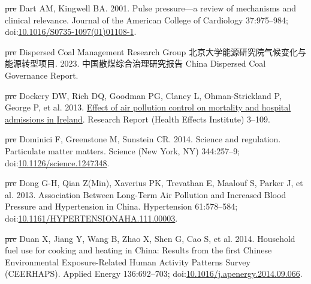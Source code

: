 \documentclass[
  letterpaper,
  DIV=11,
  numbers=noendperiod]{scrartcl}
\newlength{\cslhangindent}
\newenvironment{CSLReferences}[2] %
 {\begin{list}{}{%
  \setlength{\itemindent}{0pt} %
  \setlength{\leftmargin}{0pt} %
  \setlength{\parsep}{0pt} %
  \ifodd #1
   \setlength{\leftmargin}{\cslhangindent} %
   \setlength{\itemindent}{-1\cslhangindent} %
  \fi
  \setlength{\itemsep}{#2\baselineskip}}} %
 {\end{list}} %
\providecommand{\DIFdel}[1]{{\protect\color{red}\sout{#1}}}                      %
\providecommand{\DIFaddbegin}{} %
\providecommand{\DIFaddend}{} %
\providecommand{\DIFdelbegin}{} %
\providecommand{\DIFdelend}{} %
\newcommand{\DIFscaledelfig}{0.5}
\newlength{\DIFdelgraphicswidth} %
\newlength{\DIFdelgraphicsheight} %
\newcommand{\DIFaddincludegraphics}[2][]{{\color{blue}\fbox{\DIFOincludegraphics[#1]{#2}}}} %
\newcommand{\DIFdelincludegraphics}[2][]{%
\sbox{\DIFdelgraphicsbox}{\DIFOincludegraphics[#1]{#2}}%
\settoboxwidth{\DIFdelgraphicswidth}{\DIFdelgraphicsbox} %
\settoboxtotalheight{\DIFdelgraphicsheight}{\DIFdelgraphicsbox} %
\scalebox{\DIFscaledelfig}{%
\parbox[b]{\DIFdelgraphicswidth}{\usebox{\DIFdelgraphicsbox}\\[-\baselineskip] \rule{\DIFdelgraphicswidth}{0em}}\llap{\resizebox{\DIFdelgraphicswidth}{\DIFdelgraphicsheight}{%
\setlength{\unitlength}{\DIFdelgraphicswidth}%
\begin{picture}(1,1)%
\thicklines\linethickness{2pt} %
{\color[rgb]{1,0,0}\put(0,0){\framebox(1,1){}}}%
{\color[rgb]{1,0,0}\put(0,0){\line( 1,1){1}}}%
{\color[rgb]{1,0,0}\put(0,1){\line(1,-1){1}}}%
\end{picture}%
}\hspace*{3pt}}} %
} %
\DeclareRobustCommand{\DIFaddbegin}{\DIFOaddbegin \let\includegraphics\DIFaddincludegraphics} %
\DeclareRobustCommand{\DIFaddend}{\DIFOaddend \let\includegraphics\DIFOincludegraphics} %
\DeclareRobustCommand{\DIFdelbegin}{\DIFOdelbegin \let\includegraphics\DIFdelincludegraphics} %
\DeclareRobustCommand{\DIFdelend}{\DIFOaddend \let\includegraphics\DIFOincludegraphics} %
\begin{document}
\begin{CSLReferences}{1}{1}
\DIFdelbegin %
\DIFdel{pre}%
\DIFdelend \DIFaddbegin {}
\DIFaddend Dart AM, Kingwell BA. 2001. Pulse pressure---a review of mechanisms and
clinical relevance. Journal of the American College of Cardiology
37:975--984;
doi:\href{https://doi.org/10.1016/S0735-1097(01)01108-1}{10.1016/S0735-1097(01)01108-1}.

\DIFdelbegin %
\DIFdel{pre}%
\DIFdelend \DIFaddbegin {}
\DIFaddend Dispersed Coal Management Research Group
北京大学能源研究院气候变化与能源转型项目. 2023. 中国散煤综合治理研究报告
{China Dispersed Coal Governance Report}.

\DIFdelbegin %
\DIFdel{pre}%
\DIFdelend \DIFaddbegin {}
\DIFaddend Dockery DW, Rich DQ, Goodman PG, Clancy L, Ohman-Strickland P, George P,
et al. 2013. \href{https://www.ncbi.nlm.nih.gov/pubmed/24024358}{Effect
of air pollution control on mortality and hospital admissions in
{Ireland}}. Research Report (Health Effects Institute) 3--109.

\DIFdelbegin %
\DIFdel{pre}%
\DIFdelend \DIFaddbegin {}
\DIFaddend Dominici F, Greenstone M, Sunstein CR. 2014. Science and regulation.
{Particulate} matter matters. Science (New York, NY) 344:257--9;
doi:\href{https://doi.org/10.1126/science.1247348}{10.1126/science.1247348}.

\DIFdelbegin %
\DIFdel{pre}%
\DIFdelend \DIFaddbegin {}
\DIFaddend Dong G-H, Qian Z(Min), Xaverius PK, Trevathan E, Maalouf S, Parker J, et
al. 2013. Association {Between Long-Term Air Pollution} and {Increased
Blood Pressure} and {Hypertension} in {China}. Hypertension 61:578--584;
doi:\href{https://doi.org/10.1161/HYPERTENSIONAHA.111.00003}{10.1161/HYPERTENSIONAHA.111.00003}.

\DIFdelbegin %
\DIFdel{pre}%
\DIFdelend \DIFaddbegin {}
\DIFaddend Duan X, Jiang Y, Wang B, Zhao X, Shen G, Cao S, et al. 2014. Household
fuel use for cooking and heating in {China}: {Results} from the first
{Chinese Environmental Exposure-Related Human Activity Patterns Survey}
({CEERHAPS}). Applied Energy 136:692--703;
doi:\href{https://doi.org/10.1016/j.apenergy.2014.09.066}{10.1016/j.apenergy.2014.09.066}.


\end{CSLReferences}
\end{document}
